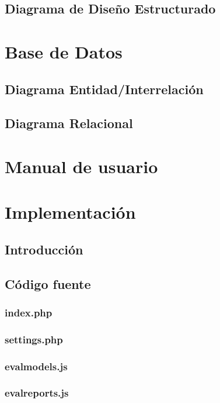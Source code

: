 \documentclass[12pt,a4paper,spanish,twoside]{article}
\begin{document}
\subsection{Diagrama de Diseño Estructurado}

\section{Base de Datos}
\subsection{Diagrama Entidad/Interrelación}
\subsection{Diagrama Relacional}

\section{Manual de usuario}

\section{Implementación}
\subsection{Introducción}
\subsection{Código fuente}
\subsubsection{index.php}

\subsubsection{settings.php}

\subsubsection{evalmodels.js}

\subsubsection{evalreports.js}

\end{document}
